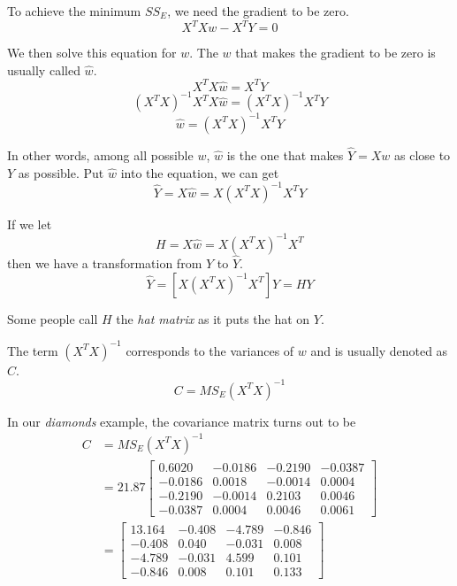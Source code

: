 \documentclass[
	letterpaper
]{article}
\begin{document}
To achieve the minimum $SS_E$, we need the gradient to be zero.
\begin{equation}
X^T X w - X^T Y = 0
\end{equation}

We then solve this equation for $w$.
The $w$ that makes the gradient to be zero is usually called $\hat w$.
\begin{equation}
X^T X \hat w = X^T Y
\end{equation}
\begin{equation}
 (X^T X)^{-1} X^T X \hat w= (X^T X)^{-1} X^T Y
\end{equation}
\begin{equation}
\hat w= (X^T X)^{-1}X^T Y
\end{equation}

In other words, among all possible $w$, $\hat w$ is the one that makes $\hat Y = Xw$ as close to $Y$ as possible.
Put $\hat w$ into the equation, we can get
\begin{equation}
\hat Y = X\hat w= X(X^T X)^{-1}X^T Y
\end{equation}

If we let
\begin{equation}
H= X\hat w= X(X^T X)^{-1}X^T
\end{equation}
then we have a transformation from $Y$ to $\hat Y$.
\begin{equation}
\hat Y = [X(X^T X)^{-1}X^T] Y = HY
\end{equation}

Some people call $H$ the \textit{hat matrix} as it puts the hat on $Y$.

The term $(X^T X)^{-1}$ corresponds to the variances of $w$ and is usually denoted as $C$.
\begin{equation}
C = MS_E (X^T X)^{-1}
\end{equation}

In our \textit{diamonds} example, the covariance matrix turns out to be
\begin{equation}
\begin{split}
C &= MS_E (X^T X)^{-1}\\
& = 21.87
\begin{bmatrix}
0.6020 & -0.0186 & -0.2190 & -0.0387\\
-0.0186 & 0.0018 & -0.0014 & 0.0004\\
-0.2190 & -0.0014 & 0.2103 & 0.0046\\
-0.0387 & 0.0004 & 0.0046 & 0.0061
\end{bmatrix}\\
& = 
\begin{bmatrix}
13.164 & -0.408 & -4.789 & -0.846\\
-0.408 & 0.040 & -0.031 & 0.008\\
-4.789& -0.031 & 4.599 & 0.101\\
-0.846 & 0.008 & 0.101 & 0.133
\end{bmatrix}\\
\end{split}
\end{equation}
\end{document}
